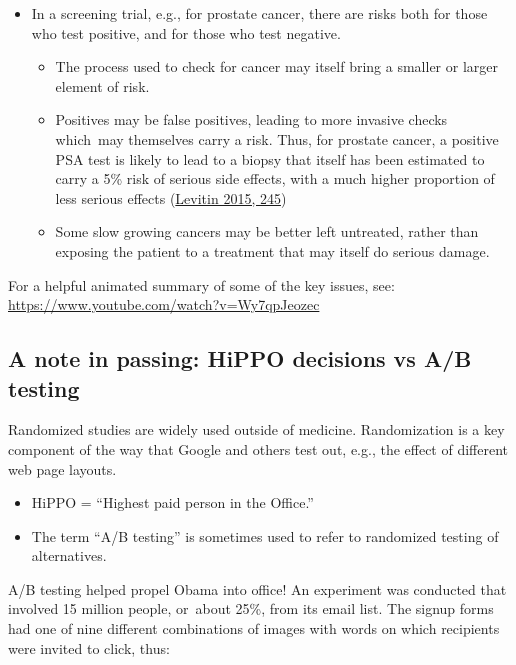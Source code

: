 \documentclass[
  10pt,
  b5paper]{book}
\providecommand{\tightlist}{%
  \setlength{\itemsep}{0pt}\setlength{\parskip}{0pt}}
\begin{document}
\begin{itemize}
\tightlist
\item
  In a screening trial, e.g., for prostate cancer, there are risks
  both for those who test positive, and for those who test negative.

  \begin{itemize}
  \tightlist
  \item
    The process used to check for cancer may itself bring a smaller
    or larger element of risk.
  \item
    Positives may be false positives, leading to more invasive
    checks which~may themselves carry a risk. Thus, for prostate
    cancer, a positive PSA test is likely to lead to a biopsy that
    itself has been estimated to carry a 5\% risk of serious side
    effects, with a much higher proportion of less serious effects
    (\protect\hyperlink{ref-levitin_2015}{Levitin 2015, 245})
  \item
    Some slow growing cancers may be better left untreated, rather
    than exposing the patient to a treatment that may itself do
    serious damage.
  \end{itemize}
\end{itemize}

For a helpful animated summary of some of the key issues, see:\\
\url{https://www.youtube.com/watch?v=Wy7qpJeozec}

\hypertarget{a-note-in-passing-hippo-decisions-vs-ab-testing}{%
\subsection*{A note in passing: HiPPO decisions vs A/B testing}\label{a-note-in-passing-hippo-decisions-vs-ab-testing}}

Randomized studies are widely used outside of medicine. Randomization is
a key component of the way that Google and others test out, e.g., the
effect of different web page layouts.

\begin{itemize}
\tightlist
\item
  HiPPO = ``Highest paid person in the Office.''
\item
  The term ``A/B testing'' is sometimes used to refer to randomized
  testing of alternatives.
\end{itemize}

A/B testing helped propel Obama into office! An experiment was conducted
that involved 15 million people, or~about 25\%, from its email list. The
signup forms had one of nine different combinations of images with words
on which recipients were invited to click, thus:
\end{document}
